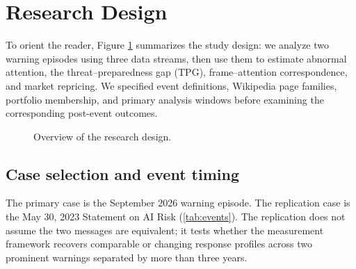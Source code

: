 \elsevierclasstrue\documentclass[preprint,12pt]{elsarticle}%
\begin{document}
\section{Research Design}

To orient the reader, Figure \ref{fig:roadmap} summarizes the study design: we analyze two warning episodes using three data streams, then use them to estimate abnormal attention, the threat--preparedness gap (TPG), frame--attention correspondence, and market repricing. We specified event definitions, Wikipedia page families, portfolio membership, and primary analysis windows before examining the corresponding post-event outcomes.

\begin{figure}[ht!]
\centering
\scriptsize
{}
\caption{Overview of the research design.}
\label{fig:roadmap}
\end{figure}


\subsection{Case selection and event timing}

The primary case is the September 2026 warning episode. The replication case is the May 30, 2023 Statement on AI Risk (\cref{tab:events}). The replication does not assume the two messages are equivalent; it tests whether the measurement framework recovers comparable or changing response profiles across two prominent warnings separated by more than three years.
\end{document}
